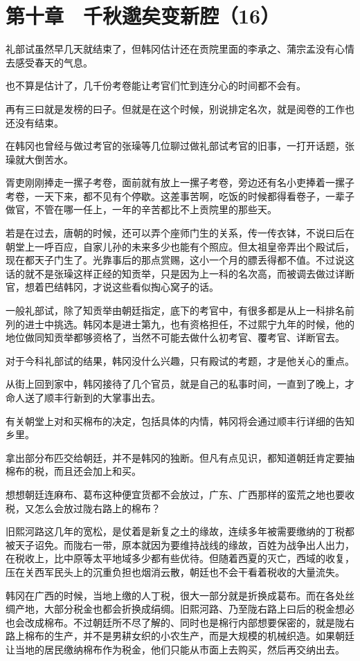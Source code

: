 \section{第十章　千秋邈矣变新腔（16）}

礼部试虽然早几天就结束了，但韩冈估计还在贡院里面的李承之、蒲宗孟没有心情去感受春天的气息。

也不算是估计了，几千份考卷能让考官们忙到连分心的时间都不会有。

再有三曰就是发榜的曰子。但就是在这个时候，别说排定名次，就是阅卷的工作也还没有结束。

在韩冈也曾经与做过考官的张璪等几位聊过做礼部试考官的旧事，一打开话题，张璪就大倒苦水。

胥吏刚刚捧走一摞子考卷，面前就有放上一摞子考卷，旁边还有名小吏捧着一摞子考卷，一天下来，都不见有个停歇。这差事苦啊，吃饭的时候都得看卷子，一辈子做官，不管在哪一任上，一年的辛苦都比不上贡院里的那些天。

若是在过去，唐朝的时候，还可以弄个座师门生的关系，传一传衣钵，不说曰后在朝堂上一呼百应，自家儿孙的未来多少也能有个照应。但太祖皇帝弄出个殿试后，现在都天子门生了。光靠事后的那点赏赐，这小一个月的膘丢得都不值。不过说这话的就不是张璪这样正经的知贡举，只是因为上一科的名次高，而被调去做过详断官，想着巴结韩冈，才说这些看似掏心窝子的话。

一般礼部试，除了知贡举由朝廷指定，底下的考官中，有很多都是从上一科排名前列的进士中挑选。韩冈本是进士第九，也有资格担任，不过熙宁九年的时候，他的地位做同知贡举都够资格了，当然不可能去做什么初考官、覆考官、详断官去。

对于今科礼部试的结果，韩冈没什么兴趣，只有殿试的考题，才是他关心的重点。

从街上回到家中，韩冈接待了几个官员，就是自己的私事时间，一直到了晚上，才命人送了顺丰行新到的大掌事出去。

有关朝堂上对和买棉布的决定，包括具体的内情，韩冈将会通过顺丰行详细的告知乡里。

拿出部分布匹交给朝廷，并不是韩冈的独断。但凡有点见识，都知道朝廷肯定要抽棉布的税，而且还会加上和买。

想想朝廷连麻布、葛布这种便宜货都不会放过，广东、广西那样的蛮荒之地也要收税，又怎么会放过陇右路上的棉布？

旧熙河路这几年的宽松，是仗着是新复之土的缘故，连续多年被需要缴纳的丁税都被天子诏免。而陇右一带，原本就因为要维持战线的缘故，百姓为战争出人出力，在税收上，比中原等太平地域多少都有些优待。但随着西夏的灭亡，西域的收复，压在关西军民头上的沉重负担也烟消云散，朝廷也不会干看着税收的大量流失。

韩冈在广西的时候，当地上缴的人丁税，很大一部分就是折换成葛布。而在各处丝绸产地，大部分税金也都会折换成绢绸。旧熙河路、乃至陇右路上曰后的税金想必也会改成棉布。不过朝廷所不尽了解的、同时也是棉行内部想要保密的，就是陇右路上棉布的生产，并不是男耕女织的小农生产，而是大规模的机械织造。如果朝廷让当地的居民缴纳棉布作为税金，他们只能从市面上去购买，然后再交纳出去。

